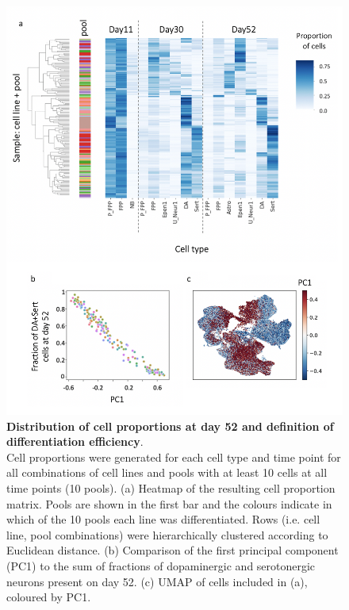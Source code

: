 \begin{figure}[htbp]
\centering
\includegraphics[width=14cm]{Chapter5/Fig/neuroseq_define_diff_efficiency.png}
\caption[Definition of differentiation efficiency]{\textbf{Distribution of cell proportions at day 52 and definition of differentiation efficiency}.\\
Cell proportions were generated for each cell type and time point for all combinations of cell lines and pools with at least 10 cells at all time points (10 pools). 
(a) Heatmap of the resulting cell proportion matrix. 
Pools are shown in the first bar and the colours indicate in which of the 10 pools each line was differentiated. 
Rows (i.e. cell line, pool combinations) were hierarchically clustered according to Euclidean distance. 
(b) Comparison of the first principal component (PC1) to the sum of fractions of dopaminergic and serotonergic neurons present on day 52.
(c) UMAP of cells included in (a), coloured by PC1.}
\label{fig:neuroseq_diff_efficiency}
\end{figure}

\clearpage

